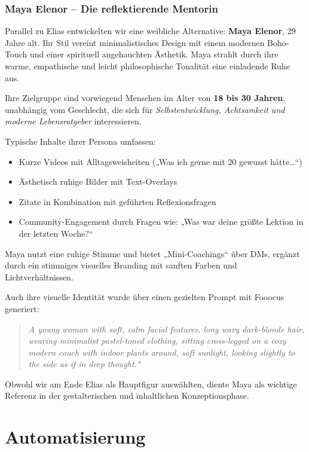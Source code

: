 \documentclass[a4paper,12pt]{article}
\begin{document}
\subsubsection*{Maya Elenor – Die reflektierende Mentorin}

Parallel zu Elias entwickelten wir eine weibliche Alternative: \textbf{Maya Elenor}, 29 Jahre alt. Ihr Stil vereint minimalistisches Design mit einem modernen Boho-Touch und einer spirituell angehauchten Ästhetik. Maya strahlt durch ihre warme, empathische und leicht philosophische Tonalität eine einladende Ruhe aus.

Ihre Zielgruppe sind vorwiegend Menschen im Alter von \textbf{18 bis 30 Jahren}, unabhängig vom Geschlecht, die sich für \textit{Selbstentwicklung, Achtsamkeit und moderne Lebensratgeber} interessieren.

Typische Inhalte ihrer Persona umfassen:

\begin{itemize}
    \item Kurze Videos mit Alltagsweisheiten („Was ich gerne mit 20 gewusst hätte…“)
    \item Ästhetisch ruhige Bilder mit Text-Overlays
    \item Zitate in Kombination mit geführten Reflexionsfragen
    \item Community-Engagement durch Fragen wie: „Was war deine größte Lektion in der letzten Woche?“
\end{itemize}
\clearpage
Maya nutzt eine ruhige Stimme und bietet „Mini-Coachings“ über DMs, ergänzt durch ein stimmiges visuelles Branding mit sanften Farben und Lichtverhältnissen.

Auch ihre visuelle Identität wurde über einen gezielten Prompt mit Fooocus generiert:

\begin{quote}
\textit{A young woman with soft, calm facial features, long wavy dark-blonde hair, wearing minimalist pastel-toned clothing, sitting cross-legged on a cozy modern couch with indoor plants around, soft sunlight, looking slightly to the side as if in deep thought."}
\end{quote}

Obwohl wir am Ende Elias als Hauptfigur auswählten, diente Maya als wichtige Referenz in der gestalterischen und inhaltlichen Konzeptionsphase.


\section{Automatisierung}
\end{document}
